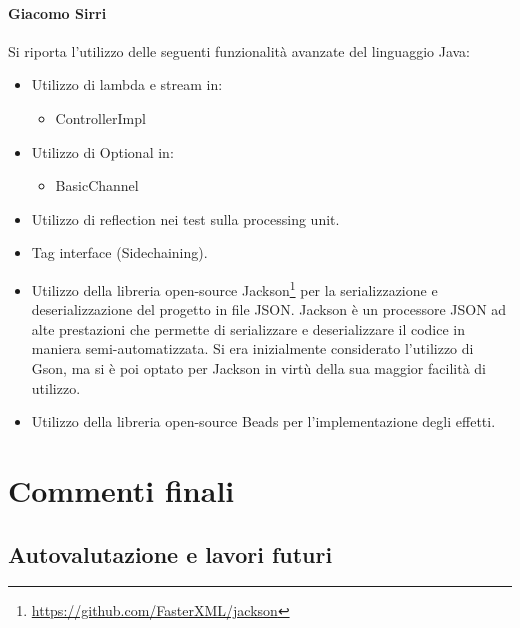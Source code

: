 \documentclass[a4paper,12pt]{report}
\begin{document}
\subsubsection{Giacomo Sirri}
Si riporta l’utilizzo delle seguenti funzionalità avanzate del linguaggio Java:
\begin{itemize}
    \item Utilizzo di lambda e stream in:
    \begin{itemize}
        \item ControllerImpl
    \end{itemize}
    \item Utilizzo di Optional in:
    \begin{itemize}
        \item BasicChannel
    \end{itemize}
    \item Utilizzo di reflection nei test sulla processing unit.
    \item Tag interface (Sidechaining).
    \item Utilizzo della libreria open-source Jackson\footnote[2]{\url{https://github.com/FasterXML/jackson}} per la serializzazione e deserializzazione del progetto in file JSON. Jackson è un processore JSON ad alte prestazioni che permette di serializzare e deserializzare il codice in maniera semi-automatizzata. Si era inizialmente considerato l’utilizzo di Gson, ma si è poi optato per Jackson in virtù della sua maggior facilità di utilizzo.
    \item Utilizzo della libreria open-source Beads per l’implementazione degli effetti.
\end{itemize}

\chapter{Commenti finali}
\section{Autovalutazione e lavori futuri}
\end{document}
